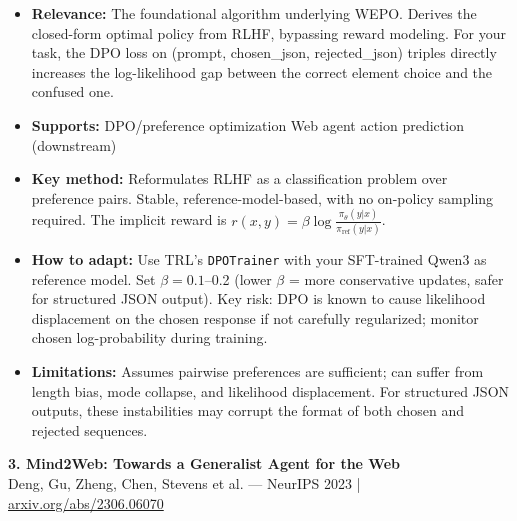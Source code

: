 \documentclass[pdflatex,sn-mathphys-num]{sn-jnl}
\theoremstyle{thmstyleone}
\theoremstyle{thmstyletwo}
\theoremstyle{thmstylethree}
\begin{document}
\begin{itemize}
    \item \textbf{Relevance:} The foundational algorithm underlying WEPO. Derives the closed-form optimal policy from RLHF, bypassing reward modeling. For your task, the DPO loss on (prompt, chosen\_json, rejected\_json) triples directly increases the log-likelihood gap between the correct element choice and the confused one.
    \item \textbf{Supports:} \checkmark DPO/preference optimization \checkmark Web agent action prediction (downstream)
    \item \textbf{Key method:} Reformulates RLHF as a classification problem over preference pairs. Stable, reference-model-based, with no on-policy sampling required. The implicit reward is $r(x,y) = \beta \log \frac{\pi_\theta(y|x)}{\pi_{\text{ref}}(y|x)}$.
    \item \textbf{How to adapt:} Use TRL's \texttt{DPOTrainer} with your SFT-trained Qwen3 as reference model. Set $\beta=0.1$--0.2 (lower $\beta$ = more conservative updates, safer for structured JSON output). Key risk: DPO is known to cause likelihood displacement on the chosen response if not carefully regularized; monitor chosen log-probability during training.
    \item \textbf{Limitations:} Assumes pairwise preferences are sufficient; can suffer from length bias, mode collapse, and likelihood displacement. For structured JSON outputs, these instabilities may corrupt the format of both chosen and rejected sequences.
\end{itemize}

\textbf{3. Mind2Web: Towards a Generalist Agent for the Web} \\
Deng, Gu, Zheng, Chen, Stevens et al. --- NeurIPS 2023 | \href{https://arxiv.org/abs/2306.06070}{arxiv.org/abs/2306.06070}
\end{document}
